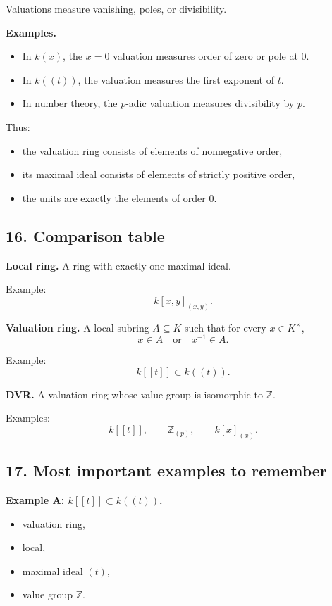 \documentclass[12pt,a4paper]{article}
\theoremstyle{notespace}
\begin{document}
Valuations measure vanishing, poles, or divisibility.

\textbf{Examples.}
\begin{itemize}
	\item In \(k(x)\), the \(x=0\) valuation measures order of zero or pole at \(0\).
	\item In \(k((t))\), the valuation measures the first exponent of \(t\).
	\item In number theory, the \(p\)-adic valuation measures divisibility by \(p\).
\end{itemize}

Thus:
\begin{itemize}
	\item the valuation ring consists of elements of nonnegative order,
	\item its maximal ideal consists of elements of strictly positive order,
	\item the units are exactly the elements of order \(0\).
\end{itemize}

\subsection{16. Comparison table}

\textbf{Local ring.}
A ring with exactly one maximal ideal.

Example:
\[
k[x,y]_{(x,y)}.
\]

\textbf{Valuation ring.}
A local subring \(A\subseteq K\) such that for every \(x\in K^\times\),
\[
x\in A \quad \text{or} \quad x^{-1}\in A.
\]

Example:
\[
k[[t]]\subset k((t)).
\]

\textbf{DVR.}
A valuation ring whose value group is isomorphic to \(\mathbb Z\).

Examples:
\[
k[[t]],\qquad \mathbb Z_{(p)},\qquad k[x]_{(x)}.
\]

\subsection{17. Most important examples to remember}

\textbf{Example A: \(k[[t]]\subset k((t))\).}
\begin{itemize}
	\item valuation ring,
	\item local,
	\item maximal ideal \((t)\),
	\item value group \(\mathbb Z\).
\end{itemize}
\end{document}
